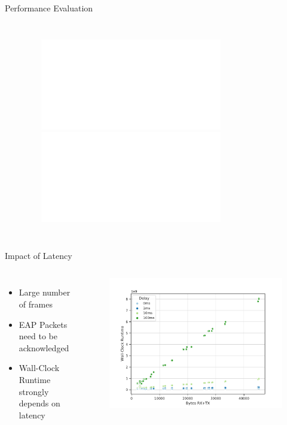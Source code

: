 \documentclass[fleqn,compress,utf8,aspectratio=169,t]{beamer}
\begin{document}
\begin{frame}{Performance Evaluation}
\begin{columns}[T]
{    }
      \vspace*{-0.5cm}
      \begin{figure}
        \includegraphics<2>[trim={0 0 0 0}, width=1\columnwidth]{plot_box_total_runtime.pdf}
        \includegraphics<3->[trim={0 0 0 0}, width=1\columnwidth]{plot_box_total_runtime_sig.pdf}
      \end{figure}
    \end{columns}
\end{frame}

\begin{frame}{Impact of Latency}
  \begin{columns}[T]
      \begin{itemize}
        \item Large number of frames
        \item EAP Packets need to be acknowledged
        \item Wall-Clock Runtime strongly depends on latency
      \end{itemize}
      \vspace*{-0.5cm}
      \begin{figure}[t]
        \centering\includegraphics[trim={-10px 0 0 0}, clip, width=1\columnwidth]{plot_scatter_handshake_time_vs_traffic_delay.pdf}
      \end{figure}
    \end{columns}
\end{frame}
\end{document}
